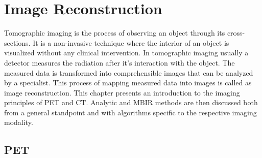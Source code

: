 
\chapter{Image Reconstruction} %

\label{Chapter1} %

Tomographic imaging is the process of observing an object through its cross-sections. It is a non-invasive technique where the interior of an object is visualized without any clinical intervention. In tomographic imaging usually a detector measures the radiation after it's interaction with the object. The measured data is transformed into comprehensible images that can be analyzed by a specialist. This process of mapping measured data into images is called as image reconstruction. This chapter presents an introduction to the imaging principles of \ac{PET} and \ac{CT}. Analytic and \ac{MBIR} methods are then discussed both from a general standpoint and with algorithms specific to the respective imaging modality.  
\section{PET}

